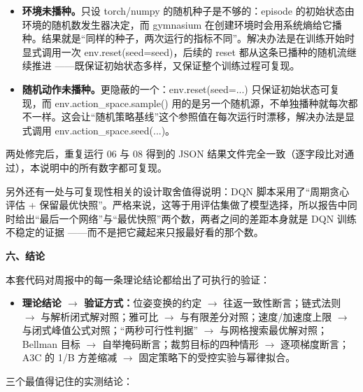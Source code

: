 \documentclass[11pt,a4paper]{ctexart}
\newcommand{\hOne}[1]{\par\vspace{0.5em}%
  {\color{hdark}\Large\bfseries #1}\par\vspace{0.1em}%
  \noindent{\color{hdark}\rule{\linewidth}{0.9pt}}\par\vspace{0.35em}}
\begin{document}
\begin{itemize}[leftmargin=1.6em,itemsep=0.15em,topsep=0.25em]

\item \textbf{环境未播种。}只设 torch/numpy 的随机种子是不够的：episode 的初始状态由环境的随机数发生器决定，而 gymnasium 在创建环境时会用系统熵给它播种。结果就是“同样的种子，两次运行的指标不同”。解决办法是在训练开始时显式调用一次 env.reset(seed=seed)，后续的 reset 都从这条已播种的随机流继续推进 ——既保证初始状态多样，又保证整个训练过程可复现。

\item \textbf{随机动作未播种。}更隐蔽的一个：env.reset(seed=...) 只保证初始状态可复现，而 env.\allowbreak action\_\allowbreak space.\allowbreak sample() 用的是另一个随机源，不单独播种就每次都不一样。这会让“随机策略基线”这个参照值在每次运行时漂移，解决办法是显式调用 env.\allowbreak action\_\allowbreak space.\allowbreak seed(...)。

\end{itemize}

两处修完后，重复运行 06 与 08 得到的 JSON 结果文件完全一致（逐字段比对通过），本说明中的所有数字都可复现。\par

另外还有一处与可复现性相关的设计取舍值得说明：DQN 脚本采用了“周期贪心评估 + 保留最优快照”。严格来说，这等于用评估集做了模型选择，所以报告中同时给出“最后一个网络”与“最优快照”两个数，两者之间的差距本身就是 DQN 训练不稳定的证据 ——而不是把它藏起来只报最好看的那个数。\par

\hOne{六、结论}

本套代码对周报中的每一条理论结论都给出了可执行的验证：\par

\begin{itemize}[leftmargin=1.6em,itemsep=0.15em,topsep=0.25em]

\item \textbf{理论结论 $\rightarrow$ 验证方式：}位姿变换的约定 $\rightarrow$ 往返一致性断言；链式法则 $\rightarrow$ 与解析闭式解对照；雅可比 $\rightarrow$ 与有限差分对照；速度/加速度上限 $\rightarrow$ 与闭式峰值公式对照；“两秒可行性判据” $\rightarrow$ 与网格搜索最优解对照；Bellman 目标 $\rightarrow$ 自举掩码断言；裁剪目标的四种情形 $\rightarrow$ 逐项梯度断言；A3C 的 1/B 方差缩减 $\rightarrow$ 固定策略下的受控实验与幂律拟合。

\end{itemize}

三个最值得记住的实测结论：\par
\end{document}
